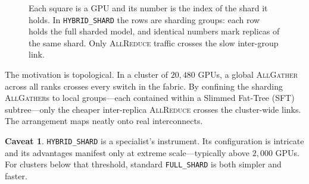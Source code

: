 \documentclass[11pt,a4paper]{article}
\theoremstyle{definition}
\newtheorem*{warning}{Caveat}
\theoremstyle{remark}
\newcommand{\AllGather}{\textsc{AllGather}}
\newcommand{\AllReduce}{\textsc{AllReduce}}
\begin{document}
\begin{figure}[ht]
\centering
{}
\caption{Each square is a GPU and its number is the index of the shard it holds. In \texttt{HYBRID\_SHARD} the rows are sharding groups: each row holds the full sharded model, and identical numbers mark replicas of the same shard. Only \AllReduce{} traffic crosses the slow inter-group link.}
\label{fig:hybrid}
\end{figure}

The motivation is topological. In a cluster of $20{,}480$ GPUs, a global \AllGather{} across all ranks crosses every switch in the fabric. By confining the sharding \AllGather{}s to local groups---each contained within a Slimmed Fat-Tree (SFT) subtree---only the cheaper inter-replica \AllReduce{} crosses the cluster-wide links. The arrangement maps neatly onto real interconnects.

\begin{warning}
\texttt{HYBRID\_SHARD} is a specialist's instrument. Its configuration is intricate and its advantages manifest only at extreme scale---typically above $2{,}000$ GPUs. For clusters below that threshold, standard \texttt{FULL\_SHARD} is both simpler and faster.
\end{warning}
\end{document}
